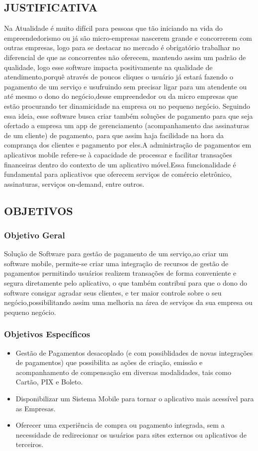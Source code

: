 \documentclass[a4paper,12pt]{article}
\begin{document}
\subsection{JUSTIFICATIVA}
Na Atualidade  é muito difícil para pessoas que tão iniciando na vida do empreendedorismo ou já são micro-empresas nascerem grande e concorrerem com outras empresas, logo para se destacar no mercado é obrigatório trabalhar no diferencial de que as  concorrentes não oferecem, mantendo assim um padrão de qualidade, logo esse software impacta positivamente na qualidade de atendimento,porquê através de poucos cliques o usuário já estará fazendo o pagamento de um serviço e usufruindo sem precisar ligar para um atendente ou até mesmo o dono do negócio,desse empreendedor ou da micro empresas que estão procurando ter dinamicidade na empresa ou no pequeno negócio.
Seguindo essa ideia, esse software busca criar também soluções de pagamento para que seja ofertado a empresa um app de gerenciamento (acompanhamento das assinaturas de um cliente) de pagamento, para que assim haja facilidade na hora da comprança dos clientes e pagamento por eles.A administração de pagamentos em aplicativos mobile refere-se à capacidade de processar e facilitar transações financeiras dentro do contexto de um aplicativo móvel.Essa funcionalidade é fundamental para aplicativos que oferecem serviços de comércio eletrônico, assinaturas, serviços on-demand, entre outros.
\subsection{OBJETIVOS}
\subsubsection{Objetivo Geral}
Solução de Software para gestão de pagamento de um serviço,ao criar um software mobile, permite-se criar uma integração de recursos de gestão de pagamentos permitindo usuários realizem transações de forma conveniente e segura diretamente pelo aplicativo, o que também contribui para que o dono do software consigar agradar seus clientes, e ter maior controle sobre o seu negócio,possibilitando assim uma melhoria na área de serviços da sua empresa ou pequeno negócio.
\subsubsection{Objetivos Específicos}
\begin{itemize}
    \item Gestão de Pagamentos desacoplado (e com possiblidades de novas integrações de pagamentos) que possibilita as ações de criação, emissão e acompanhamento de compensação em diversas modalidades, tais como Cartão, PIX e Boleto.
    \item Disponibilizar um Sistema Mobile para tornar o aplicativo mais acessível para as Empresas.
    \item Oferecer uma experiência de compra ou pagamento integrada, sem a necessidade de redirecionar os usuários para sites externos ou aplicativos de terceiros.
\end{itemize}
\end{document}
